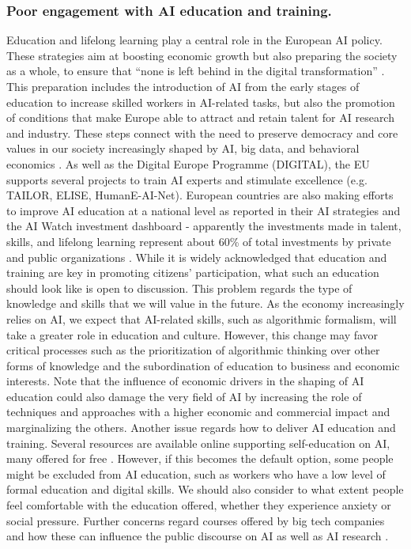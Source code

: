 \documentclass{article}
\begin{document}
 \subsubsection{\textbf{Poor engagement with AI education and training}.}
Education and lifelong learning play a central role in the European AI policy. These strategies aim at boosting economic growth but also preparing the society as a whole, to ensure that ``none is left behind in the digital transformation'' \cite{ai_agenda}. This preparation includes the introduction of AI from the early stages of education to increase skilled workers in AI-related tasks, but also the promotion of conditions that make Europe able to attract and retain talent for AI research and industry. These steps connect with the need to preserve democracy and core values in our society increasingly shaped by AI, big data, and behavioral economics \cite{helbing2019will, cristianini2020social}. 
As well as the Digital Europe Programme (DIGITAL), the EU supports several projects to train AI experts and stimulate excellence (e.g. TAILOR, ELISE, HumanE-AI-Net). European countries are also making efforts to improve AI education at a national level as reported in their AI strategies \cite{Foffano22} and the AI Watch investment dashboard - apparently the investments made in talent, skills, and lifelong learning represent about 60\% of total investments by private and public organizations \cite{AIwatch}.
While it is widely acknowledged that education and training are key in promoting citizens' participation, what such an education should look like is open to discussion. This problem regards the type of knowledge and skills that we will value in the future. As the economy increasingly relies on AI, we expect that AI-related skills, such as algorithmic formalism\cite{green2020algorithmic}, will take a greater role in education and culture. However, this change may favor critical processes such as the prioritization of algorithmic thinking over other forms of knowledge \cite{boyd2012critical} and the subordination of education to business and economic interests. Note that the influence of economic drivers in the shaping of AI education could also damage the very field of AI by increasing the role of techniques and approaches with a higher economic and commercial impact and marginalizing the others.
Another issue regards how to deliver AI education and training. Several resources are available online supporting self-education on AI, many offered for free \cite{elemAI}. However, if this becomes the default option, some people might be excluded from AI education, such as workers who have a low level of formal education and digital skills. We should also consider to what extent people feel comfortable with the education offered, whether they experience anxiety or social pressure. Further concerns regard courses offered by big tech companies and how these can influence the public discourse on AI as well as AI research \cite{luchs2023learning}.
\end{document}
